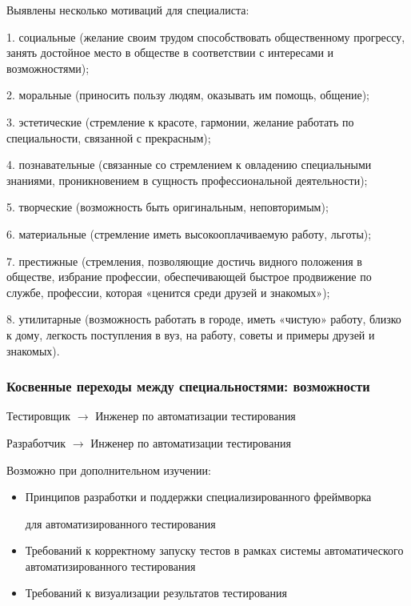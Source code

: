 \documentclass{../industrial-development}
\begin{document}
\lecturenotes

Выявлены несколько мотиваций для специалиста:

1. социальные (желание своим трудом способствовать общественному прогрессу, занять достойное место в обществе в соответствии с интересами и возможностями);

2. моральные (приносить пользу людям, оказывать им помощь, общение);

3. эстетические (стремление к красоте, гармонии, желание работать по специальности, связанной с прекрасным);

4. познавательные (связанные со стремлением к овладению специальными знаниями, проникновением в сущность профессиональной деятельности);

5. творческие (возможность быть оригинальным, неповторимым);

6. материальные (стремление иметь высокооплачиваемую работу, льготы);

7. престижные (стремления, позволяющие достичь видного положения в обществе, избрание профессии, обеспечивающей быстрое продвижение по службе, профессии, которая «ценится среди друзей и знакомых»);

8. утилитарные (возможность работать в городе, иметь «чистую» работу, близко к дому, легкость поступления в вуз, на работу, советы и примеры друзей и знакомых).

 \begin{frame} \frametitle{Косвенные переходы между специальностями: возможности }

 \begin{block}{Тестировщик $\rightarrow$  Инженер по автоматизации тестирования    

Разработчик $\rightarrow$   Инженер по автоматизации тестирования }
Возможно при дополнительном изучении:
  \end{block}
\begin{itemize}
  \item Принципов разработки и поддержки специализированного фреймворка 

для автоматизированного тестирования
  \item Требований к корректному запуску тестов в рамках системы автоматического автоматизированного тестирования
\item Требований к визуализации результатов тестирования
  \end{itemize}
\end{frame}

\lecturenotes
\end{document}
